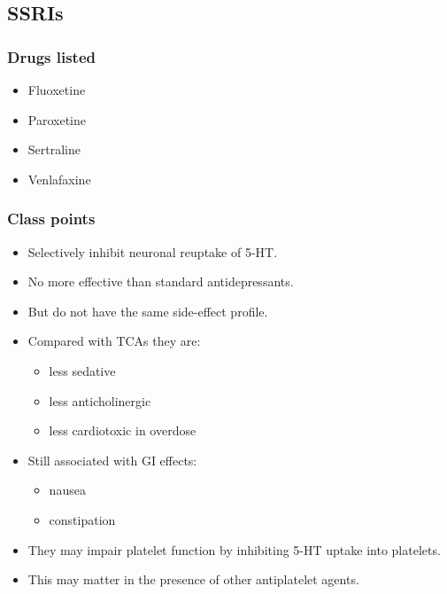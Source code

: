 \documentclass[11pt,a4paper]{article}
\begin{document}
\subsection{SSRIs}

\subsubsection{Drugs listed}
\begin{itemize}
  \item Fluoxetine
  \item Paroxetine
  \item Sertraline
  \item Venlafaxine
\end{itemize}

\subsubsection{Class points}
\begin{itemize}
  \item Selectively inhibit neuronal reuptake of 5-HT.
  \item No more effective than standard antidepressants.
  \item But do not have the same side-effect profile.
  \item Compared with TCAs they are:
  \begin{itemize}
    \item less sedative
    \item less anticholinergic
    \item less cardiotoxic in overdose
  \end{itemize}
  \item Still associated with GI effects:
  \begin{itemize}
    \item nausea
    \item constipation
  \end{itemize}
  \item They may impair platelet function by inhibiting 5-HT uptake into platelets.
  \item This may matter in the presence of other antiplatelet agents.
\end{itemize}
\end{document}
